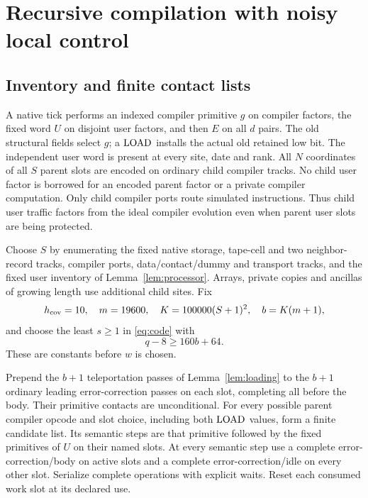 \section{Recursive compilation with noisy local control}\label{sec:compiler}
\subsection{Inventory and finite contact lists}
A native tick performs an indexed compiler primitive $g$ on compiler factors, the fixed word $U$ on disjoint user factors, and then $E$ on all $d$ pairs. The old structural fields select $g$; a $\operatorname{LOAD}$ installs the actual old retained low bit. The independent user word is present at every site, date and rank. All $N$ coordinates of all $S$ parent slots are encoded on ordinary child compiler tracks. No child user factor is borrowed for an encoded parent factor or a private compiler computation. Only child compiler ports route simulated instructions. Thus child user traffic factors from the ideal compiler evolution even when parent user slots are being protected.

Choose $S$ by enumerating the fixed native storage, tape-cell and two neighbor-record tracks, compiler ports, data/contact/dummy and transport tracks, and the fixed user inventory of Lemma~\ref{lem:processor}. Arrays, private copies and ancillas of growing length use additional child sites. Fix
\begin{equation}\label{eq:budgets}
 h_{\rm cov}=10,\quad m=19600,\quad
 K=100000(S+1)^2,\quad b=K(m+1),
\end{equation}
and choose the least $s\ge1$ in \eqref{eq:code} with
\begin{equation}\label{eq:codemargin}
 q-8\ge160b+64.
\end{equation}
These are constants before $w$ is chosen.

Prepend the $b+1$ teleportation passes of Lemma~\ref{lem:loading} to the $b+1$ ordinary leading error-correction passes on each slot, completing all before the body. Their primitive contacts are unconditional. For every possible parent compiler opcode and slot choice, including both $\operatorname{LOAD}$ values, form a finite candidate list. Its semantic steps are that primitive followed by the fixed primitives of $U$ on their named slots. At every semantic step use a complete error-correction/body on active slots and a complete error-correction/idle on every other slot. Serialize complete operations with explicit waits. Reset each consumed work slot at its declared use.

